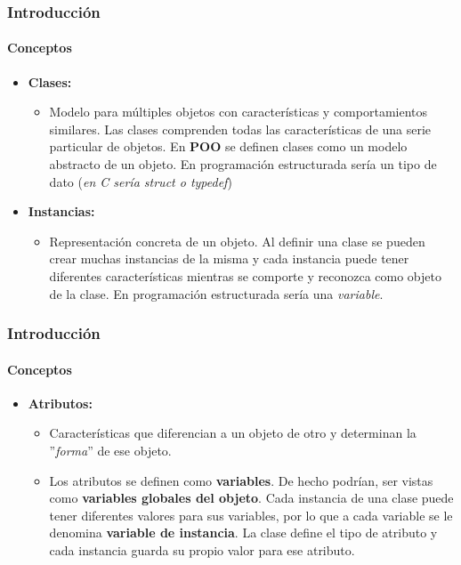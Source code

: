 \documentclass{beamer}
\begin{document}
		\begin{frame}
			\frametitle{Introducci\'on}
			\framesubtitle{Conceptos}

			\begin{itemize}
  				\item \textbf{Clases:}
				\begin{itemize}
  					\item[] Modelo para m\'ultiples objetos con caracter\'isticas y comportamientos similares. Las clases comprenden todas las caracter\'isticas de una serie particular de objetos. En \textbf{POO} se definen clases como un modelo abstracto de un objeto. En programaci\'on estructurada ser\'ia un tipo de dato (\emph{en C ser\'ia struct o typedef})
				\end{itemize}
				\item \textbf{Instancias:}
				\begin{itemize}
  					\item[] Representaci\'on concreta de un objeto. Al definir una clase se pueden crear muchas instancias de la misma y cada instancia puede tener diferentes caracter\'isticas mientras se comporte y reconozca como objeto de la clase. En programaci\'on estructurada ser\'ia una \emph{variable}.
				\end{itemize}
			\end{itemize}
		\end{frame}

		\begin{frame}
			\frametitle{Introducci\'on}
			\framesubtitle{Conceptos}

			\begin{itemize}
  				\item \textbf{Atributos:}
				\begin{itemize}
  					\item[] Caracter\'isticas que diferencian a un objeto de otro y determinan la ''\emph{forma}'' de ese objeto.
  					\item[] Los atributos se definen como \textbf{variables}. De hecho podr\'ian, ser vistas como \textbf{variables globales del objeto}. Cada instancia de una clase puede tener diferentes valores para sus variables, por lo que a cada variable se le denomina \textbf{variable de instancia}. La clase define el tipo de atributo y cada instancia guarda su propio valor para ese atributo.
				\end{itemize}
			\end{itemize}
		\end{frame}
\end{document}
